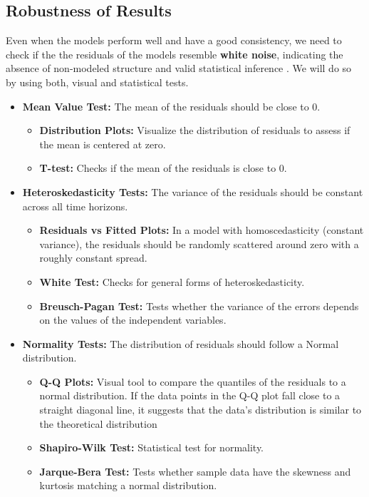 \documentclass[11pt,english,a4paper,hidelinks]{book}
\begin{document}
\subsection{Robustness of Results}
Even when the models perform well and have a good consistency, we need to check if the the residuals of the models resemble \textbf{white noise}, indicating the absence of non-modeled structure and valid statistical inference \textcite{enders1948applied}. We will do so by using both, visual and statistical tests.
\begin{itemize}
    \item \textbf{Mean Value Test:} The mean of the residuals should be close to 0.
        \begin{itemize}
            \item \textbf{Distribution Plots:} Visualize the distribution of residuals to assess if the mean is centered at zero.
            \item \textbf{T-test:} Checks if the mean of the residuals is close to 0.
        \end{itemize}
    \item \textbf{Heteroskedasticity Tests:} The variance of the residuals should be constant across all time horizons.
        \begin{itemize}
            \item \textbf{Residuals vs Fitted Plots:} In a model with homoscedasticity (constant variance), the residuals should be randomly scattered around zero with a roughly constant spread.
            \item \textbf{White Test:} Checks for general forms of heteroskedasticity.
            \item \textbf{Breusch-Pagan Test:} Tests whether the variance of the errors depends on the values of the independent variables.
        \end{itemize}
    \item \textbf{Normality Tests:} The distribution of residuals should follow a Normal distribution.
        \begin{itemize}
            \item \textbf{Q-Q Plots:} Visual tool to compare the quantiles of the residuals to a normal distribution. If the data points in the Q-Q plot fall close to a straight diagonal line, it suggests that the data's distribution is similar to the theoretical distribution
            \item \textbf{Shapiro-Wilk Test:} Statistical test for normality.
            \item \textbf{Jarque-Bera Test:} Tests whether sample data have the skewness and kurtosis matching a normal distribution.

\end{itemize}
\end{itemize}
\end{document}
